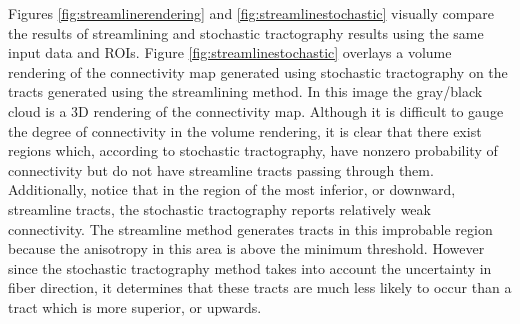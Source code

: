 Figures \ref{fig:streamlinerendering} and \ref{fig:streamlinestochastic} visually compare the results of streamlining and stochastic tractography results using the same input data and ROIs.  Figure \ref{fig:streamlinestochastic} overlays a volume rendering of the connectivity map generated using stochastic tractography on the tracts generated using the streamlining method.  In this image the gray/black cloud is a 3D rendering of the connectivity map.  Although it is difficult to gauge the degree of connectivity in the volume rendering, it is clear that there exist regions which, according to stochastic tractography, have nonzero probability of connectivity but do not have streamline tracts passing through them.  Additionally, notice that in the region of the most inferior, or downward, streamline tracts, the stochastic tractography reports relatively weak connectivity.  The streamline method generates tracts in this improbable region because the anisotropy in this area is above the minimum threshold.  However since the stochastic tractography method takes into account the uncertainty in fiber direction, it determines that these tracts are much less likely to occur than a tract which is more superior, or upwards.

